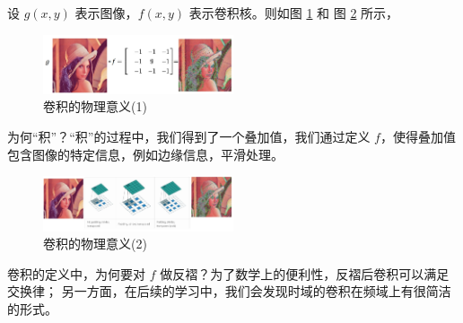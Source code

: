 \begin{example}[卷积的物理意义]
    设 $g(x, y)$ 表示图像，$f(x, y)$ 表示卷积核。则如图 \ref{fig:graph-convolution-example-1} 和
    图 \ref{fig:graph-convolution-example-2} 所示，
    \begin{figure}[H]
        \centering
        \includegraphics[width=0.5\textwidth]{chap1/img/graph-convolution-example-1.png}
        \caption{卷积的物理意义(1)}
        \label{fig:graph-convolution-example-1}
    \end{figure}
    为何``积''？``积''的过程中，我们得到了一个叠加值，我们通过定义 $f$，使得叠加值包含图像的特定信息，例如边缘信息，平滑处理。
    \begin{figure}[H]
        \centering
        \includegraphics[width=0.5\textwidth]{chap1/img/graph-convolution-example-2.png}
        \caption{卷积的物理意义(2)}
        \label{fig:graph-convolution-example-2}
    \end{figure}
\end{example}

\begin{note}
    卷积的定义中，为何要对 $f$ 做反褶？为了数学上的便利性，反褶后卷积可以满足交换律；
    另一方面，在后续的学习中，我们会发现时域的卷积在频域上有很简洁的形式。
\end{note}
